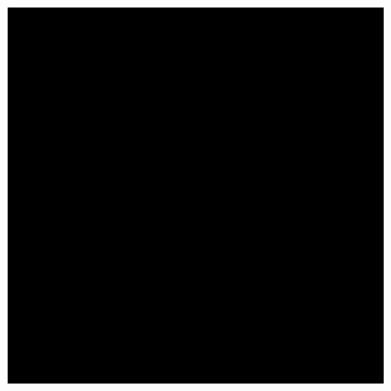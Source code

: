 \documentclass[fontset=fandol,type=bachelor,campus=harbin,bsmainpagenumberline=true]{hithesisbook}
\begin{document}
\begin{figure}[h]
{\begin{minipage}[h]{0.40\textwidth}
   		 	\includegraphics[width=1\textwidth]{chapter6/替身}
    		\end{minipage}
		\label{重复性精度测试b}
    	}
	\\ 
\end{figure}
\end{document}
